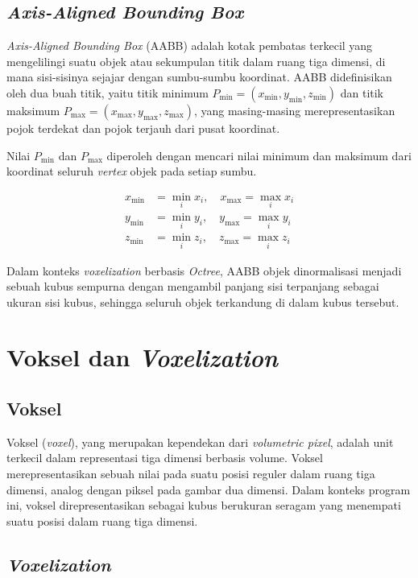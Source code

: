 \subsection{\textit{Axis-Aligned Bounding Box}}

\textit{Axis-Aligned Bounding Box} (AABB) adalah kotak pembatas terkecil yang
mengelilingi suatu objek atau sekumpulan titik dalam ruang tiga dimensi, di mana
sisi-sisinya sejajar dengan sumbu-sumbu koordinat. AABB didefinisikan oleh dua
buah titik, yaitu titik minimum $P_{\min} = (x_{\min}, y_{\min}, z_{\min})$ dan
titik maksimum $P_{\max} = (x_{\max}, y_{\max}, z_{\max})$, yang masing-masing
merepresentasikan pojok terdekat dan pojok terjauh dari pusat koordinat.

Nilai $P_{\min}$ dan $P_{\max}$ diperoleh dengan mencari nilai minimum dan
maksimum dari koordinat seluruh \textit{vertex} objek pada setiap sumbu.

\begin{align}
    x_{\min} & = \min_{i} x_i, \quad x_{\max} = \max_{i} x_i \\
    y_{\min} & = \min_{i} y_i, \quad y_{\max} = \max_{i} y_i \\
    z_{\min} & = \min_{i} z_i, \quad z_{\max} = \max_{i} z_i
\end{align}

Dalam konteks \textit{voxelization} berbasis \textit{Octree}, AABB objek
dinormalisasi menjadi sebuah kubus sempurna dengan mengambil panjang sisi
terpanjang sebagai ukuran sisi kubus, sehingga seluruh objek terkandung di dalam
kubus tersebut.

\section{Voksel dan \textit{Voxelization}}

\subsection{Voksel}

Voksel (\textit{voxel}), yang merupakan kependekan dari \textit{volumetric pixel},
adalah unit terkecil dalam representasi tiga dimensi berbasis volume. Voksel
merepresentasikan sebuah nilai pada suatu posisi reguler dalam ruang tiga dimensi,
analog dengan piksel pada gambar dua dimensi. Dalam konteks program ini, voksel
direpresentasikan sebagai kubus berukuran seragam yang menempati suatu posisi
dalam ruang tiga dimensi.

\subsection{\textit{Voxelization}}

